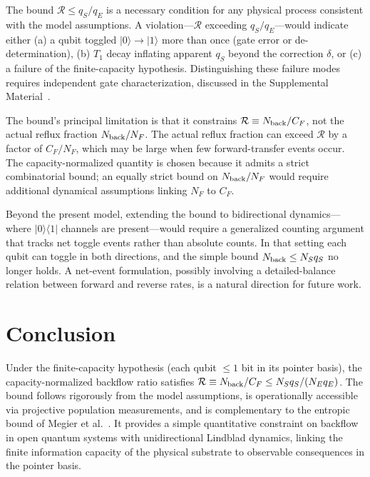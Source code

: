 \documentclass[aps,pra,twocolumn,superscriptaddress,hyperref]{revtex4-2}
\begin{document}
The bound $\mathcal{R} \leq q_S/q_E$ is a necessary condition for any physical process consistent with the model assumptions. A violation---$\mathcal{R}$ exceeding $q_S/q_E$---would indicate either (a) a qubit toggled $|0\rangle \to |1\rangle$ more than once (gate error or de-determination), (b) $T_1$ decay inflating apparent $q_S$ beyond the correction $\delta$, or (c) a failure of the finite-capacity hypothesis. Distinguishing these failure modes requires independent gate characterization, discussed in the Supplemental Material~\cite{SM}.

The bound's principal limitation is that it constrains $\mathcal{R} \equiv N_{\rm back}/C_F$, not the actual reflux fraction $N_{\rm back}/N_F$. The actual reflux fraction can exceed $\mathcal{R}$ by a factor of $C_F/N_F$, which may be large when few forward-transfer events occur. The capacity-normalized quantity is chosen because it admits a strict combinatorial bound; an equally strict bound on $N_{\rm back}/N_F$ would require additional dynamical assumptions linking $N_F$ to $C_F$.

Beyond the present model, extending the bound to bidirectional dynamics---where $|0\rangle\langle 1|$ channels are present---would require a generalized counting argument that tracks net toggle events rather than absolute counts. In that setting each qubit can toggle in both directions, and the simple bound $N_{\rm back} \leq N_S q_S$ no longer holds. A net-event formulation, possibly involving a detailed-balance relation between forward and reverse rates, is a natural direction for future work.

\section{Conclusion}

Under the finite-capacity hypothesis (each qubit $\leq 1$ bit in its pointer basis), the capacity-normalized backflow ratio satisfies $\mathcal{R} \equiv N_{\rm back}/C_F \leq N_S q_S/(N_E q_E)$. The bound follows rigorously from the model assumptions, is operationally accessible via projective population measurements, and is complementary to the entropic bound of Megier et al.~\cite{Megier:2021}. It provides a simple quantitative constraint on backflow in open quantum systems with unidirectional Lindblad dynamics, linking the finite information capacity of the physical substrate to observable consequences in the pointer basis.
\end{document}

